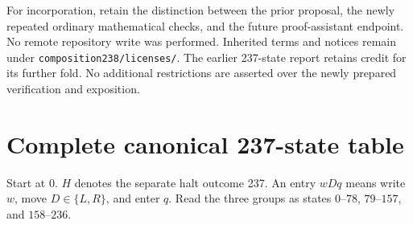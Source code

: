 \documentclass[11pt]{article}
\newcommand{\file}[1]{\nolinkurl{#1}}
\begin{document}
For incorporation, retain the distinction between the prior proposal,
the newly repeated ordinary mathematical checks, and the future
proof-assistant endpoint.  No remote repository write was performed.
Inherited terms and notices remain under \file{composition238/licenses/}.
The earlier 237-state report retains credit for its further fold.  No
additional restrictions are asserted over the newly prepared verification
and exposition.

\clearpage
\appendix
\section{Complete canonical 237-state table}
Start at 0.  $H$ denotes the separate halt outcome 237.  An entry $wDq$
means write $w$, move $D\in\{L,R\}$, and enter $q$.  Read the three groups
as states $0$--$78$, $79$--$157$, and $158$--$236$.

\end{document}
